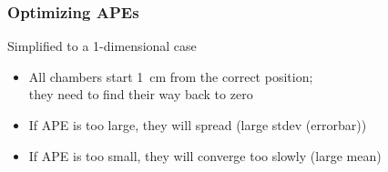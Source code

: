 \documentclass[compress]{beamer}
\begin{document}
\begin{frame}
\frametitle{Optimizing APEs}

Simplified to a 1-dimensional case
\begin{itemize}
\item All chambers start 1~cm from the correct position; \\ they need to find their way back to zero
\item If APE is too large, they will spread (large stdev (errorbar))
\item If APE is too small, they will converge too slowly (large mean)
\end{itemize}
\begin{center}
\end{center}
\end{frame}
\end{document}
